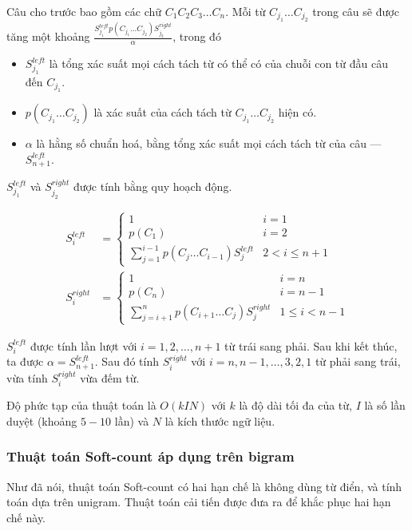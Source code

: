 \documentclass[a4paper,oneside,14pt]{extbook} %
\begin{document}
Câu cho trước bao gồm các chữ $C_1C_2C_3\ldots C_n$. Mỗi từ
$C_{j_1}\ldots C_{j_2}$ trong câu sẽ được tăng một khoảng
$\frac{S_{j_1}^{left}p(C_{j_1}\ldots
  C_{j_2})S_{j_2}^{right}}{\alpha}$, trong đó
\begin{itemize}
\item $S_{j_1}^{left}$ là tổng xác suất mọi cách tách từ có thể có của
  chuỗi con từ đầu câu đến $C_{j_1}$.
\item $p(C_{j_1}\ldots C_{j_2})$ là xác suất của cách tách từ
  $C_{j_1}\ldots C_{j_2}$ hiện có.
\item $\alpha$ là hằng số chuẩn hoá, bằng tổng xác suất mọi cách tách
  từ của câu --- $S_{n+1}^{left}$.
\end{itemize}

$S_{j_1}^{left}$ và $S_{j_2}^{right}$ được tính bằng quy hoạch động. 

\begin{align*}
S_i^{left} &= \left\{
    \begin{array}{ll}
      1&i=1\\
      p(C_1)&i=2\\
      \sum_{j=1}^{i-1}p(C_j\ldots C_{i-1})S_j^{left}&2<i\le n+1
    \end{array}
  \right.\\
S_i^{right} &= \left\{
    \begin{array}{ll}
      1& i=n\\
      p(C_n)& i=n-1\\
      \sum_{j=i+1}^{n}p(C_{i+1}\ldots C_j)S_j^{right}&1\le i<n-1
    \end{array}
  \right.
\end{align*}

$S_i^{left}$ được tính lần lượt với $i=1,2,\ldots,n+1$ từ trái sang
phải. Sau khi kết thúc, ta được $\alpha=S_{n+1}^{left}$. Sau đó tính
$S_i^{right}$ với $i=n,n-1,\ldots,3,2,1$ từ phải sang trái, vừa tính
$S_i^{right}$ vừa đếm từ.

Độ phức tạp của thuật toán là $O(kIN)$ với $k$ là độ dài tối đa của
từ, $I$ là số lần duyệt (khoảng $5-10$ lần) và $N$ là kích thước ngữ
liệu.

\subsubsection{Thuật toán Soft-count áp dụng trên bigram}

Như đã nói, thuật toán Soft-count có hai hạn chế là không dùng từ
điển, và tính toán dựa trên unigram. Thuật toán cải tiến được đưa ra
để khắc phục hai hạn chế này.
\end{document}
